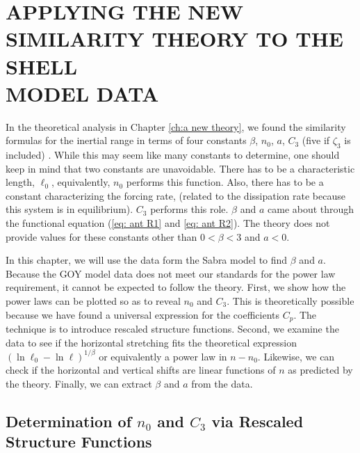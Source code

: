 
\chapter{APPLYING THE NEW SIMILARITY THEORY TO THE SHELL \\ MODEL DATA} \label{ch: before the theory}

In the theoretical analysis in Chapter \ref{ch:a new theory}, we found the similarity formulas for the inertial range in terms of four constants $\beta$, $n_0$, $a$, $C_3$ (five if $\zeta_3$ is included) .  While this may seem like many constants to determine, one should keep in mind that two constants are unavoidable.  There has to be a characteristic length, $\ell_0$, equivalently, $n_0$ performs this function.  Also, there has to be a constant characterizing the forcing rate, (related to the dissipation rate because this system is in equilibrium).  $C_3$ performs this role.  $\beta$ and $a$ came about through the functional equation (\ref{eq: ant R1} and \ref{eq: ant R2}).  The theory does not provide values for these constants other than $0<\beta<3$ and $a<0$.

In this chapter, we will use the data form the Sabra model to find $\beta$ and $a$.  Because the GOY model data does not meet our standards for the power law requirement, it cannot be expected to follow the theory. First, we show how the power laws can be plotted so as to reveal $n_0$ and $C_3$.  This is theoretically possible because we have found a universal expression for the coefficients $C_p$.  The technique is to introduce rescaled structure functions. Second, we examine the data to see if the horizontal stretching fits the theoretical expression $(\ln \ell_0 - \ln \ell)^{1/\beta}$ or equivalently a power law in $n - n_0$.  Likewise, we can check if the horizontal and vertical shifts are linear functions of $n$ as predicted by the theory.  Finally, we can extract $\beta$ and $a$ from the data.

\vspace{2in}

\section{Determination of $n_0$ and $C_3$ via Rescaled Structure Functions}

